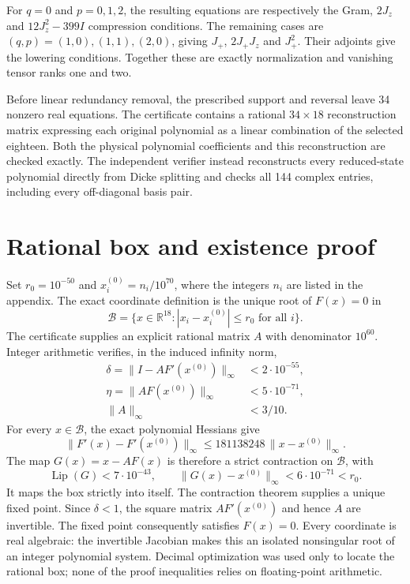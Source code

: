 \documentclass[11pt]{article}
\begin{document}
For $q=0$ and $p=0,1,2$, the resulting equations are respectively the Gram,
$2J_z$ and $12J_z^2-399I$ compression conditions. The remaining cases are
$(q,p)=(1,0),(1,1),(2,0)$, giving $J_+$, $2J_+J_z$ and $J_+^2$.
Their adjoints give the lowering conditions. Together these are exactly
normalization and vanishing tensor ranks one and two.

Before linear redundancy removal, the prescribed support and reversal leave
34 nonzero real equations. The certificate contains a rational $34\times18$
reconstruction matrix expressing each original polynomial as a linear
combination of the selected eighteen. Both the physical polynomial coefficients
and this reconstruction are checked exactly. The independent verifier instead
reconstructs every reduced-state polynomial directly from Dicke splitting and
checks all 144 complex entries, including every off-diagonal basis pair.

\section{Rational box and existence proof}
Set $r_0=10^{-50}$ and $x_i^{(0)}=n_i/10^{70}$, where the integers $n_i$
are listed in the appendix. The exact coordinate definition is the unique root
of $F(x)=0$ in
\[
\mathcal B=\{x\in\mathbb R^{18}:|x_i-x_i^{(0)}|\le r_0\text{ for all }i\}.
\]
The certificate supplies an explicit rational matrix $A$ with denominator
$10^{60}$. Integer arithmetic verifies, in the induced infinity norm,
\begin{align*}
\delta=\|I-AF'(x^{(0)})\|_\infty&<2\cdot10^{-55},\\
\eta=\|AF(x^{(0)})\|_\infty&<5\cdot10^{-71},\\
\|A\|_\infty&<3/10.
\end{align*}
For every $x\in\mathcal B$, the exact polynomial Hessians give
\[
\|F'(x)-F'(x^{(0)})\|_\infty
\le181138248\,\|x-x^{(0)}\|_\infty.
\]
The map $G(x)=x-AF(x)$ is therefore a strict contraction on $\mathcal B$, with
\[
\operatorname{Lip}(G)<7\cdot10^{-43},\qquad
\|G(x)-x^{(0)}\|_\infty<6\cdot10^{-71}<r_0.
\]
It maps the box strictly into itself. The contraction theorem supplies a unique
fixed point. Since $\delta<1$, the square matrix $AF'(x^{(0)})$ and hence $A$
are invertible. The fixed point consequently satisfies $F(x)=0$.
Every coordinate is real algebraic: the invertible Jacobian makes this an
isolated nonsingular root of an integer polynomial system. Decimal optimization
was used only to locate the rational box; none of the proof inequalities relies
on floating-point arithmetic.
\end{document}
